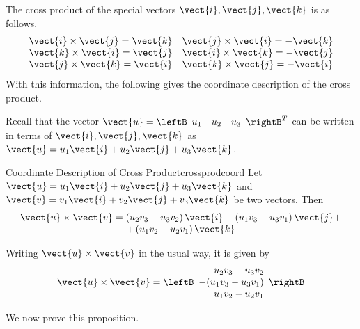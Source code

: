 The cross product of the special vectors $\vect{i}, \vect{j},
\vect{k}$ is as follows.  
\begin{equation*}
\begin{array}{cc}
\vect{i}\times \vect{j}=\vect{k} & \vect{j}\times \vect{i}=-\vect{k} \\
\vect{k}\times \vect{i}=\vect{j} & \vect{i}\times \vect{k}=-\vect{j} \\
\vect{j}\times \vect{k}=\vect{i} & \vect{k}\times \vect{j}=-\vect{i}
\end{array}
\end{equation*}
With this information, the following gives the coordinate description of the
cross product.

Recall that the vector $\vect{u}= \leftB 
\begin{array}{ccc}
u_1 & u_2 & u_3
\end{array}
\rightB^T$
can be written in terms of $\vect{i}, \vect{j}, \vect{k}$ as $\vect{u}=u_{1}\vect{i}+u_{2}\vect{j}+u_{3}\vect{k}$. 

\begin{proposition}{Coordinate Description of Cross Product}{crossprodcoord}
 Let $\vect{u}=u_{1}\vect{i}+u_{2}\vect{j}+u_{3}\vect{k}$
 and $\vect{v}=v_{1}\vect{i}+v_{2}\vect{j}+v_{3}\vect{k}$ be two
vectors. Then
\begin{equation}
\begin{array}{c}
\vect{u}\times \vect{v} 
 =\left( u_{2}v_{3}-u_{3}v_{2}\right) \vect{i}-\left(
u_{1}v_{3} - u_{3}v_{1}\right) \vect{j}+  \\
 +\left( u_{1}v_{2}-u_{2}v_{1}\right) \vect{k}  \label{crossprod1}
\end{array}
\end{equation}
\end{proposition}

Writing $\vect{u} \times \vect{v}$ in the usual way, it is given by 
\begin{equation*}
\vect{u} \times \vect{v}
=
\leftB
\begin{array}{r}
 u_{2}v_{3}-u_{3}v_{2} \\
-(u_{1}v_{3}-u_{3}v_{1}) \\
 u_{1}v_{2}-u_{2}v_{1}
\end{array}
\rightB
\end{equation*}

We now prove this proposition. 

